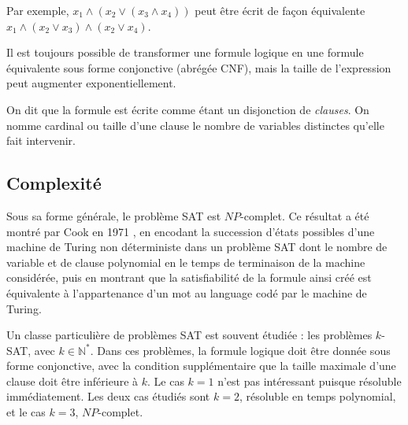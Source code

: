 Par exemple, $x_1 \wedge (x_2 \vee (x_3 \wedge x_4))$ peut être écrit de façon
équivalente $x_1 \wedge (x_2 \vee x_3) \wedge (x_2 \vee x_4)$.

Il est toujours possible de transformer une formule logique en une formule
équivalente sous forme conjonctive (abrégée CNF), mais la taille de
l'expression peut augmenter exponentiellement. 

On dit que la formule est écrite comme étant un disjonction de \textit{clauses}.
On nomme cardinal ou taille d'une clause le nombre de variables distinctes
qu'elle fait intervenir.

\subsection{Complexité}
Sous sa forme générale, le problème SAT est $NP$-complet. Ce résultat a été
montré par Cook en 1971 \cite{cook71}, en encodant la succession d'états
possibles d'une machine de Turing non déterministe dans un problème SAT dont
le nombre de variable et de clause polynomial en le temps de terminaison de
la machine considérée, puis en montrant que la satisfiabilité de la formule
ainsi créé est équivalente à l'appartenance d'un mot au language codé par le
machine de Turing.

Un classe particulière de problèmes SAT est souvent étudiée : les problèmes
$k$-SAT, avec $k\in\mathbb{N}^*$. Dans ces problèmes, la formule logique doit
être donnée sous forme conjonctive, avec la condition supplémentaire que la
taille maximale d'une clause doit être inférieure à $k$. Le cas $k=1$ n'est pas
intéressant puisque résoluble immédiatement. Les deux cas étudiés sont $k=2$,
résoluble en temps polynomial, et le cas $k=3$, $NP$-complet.




